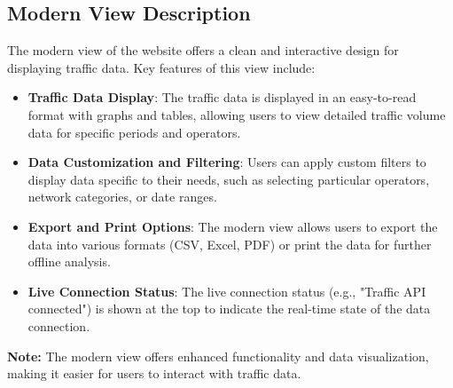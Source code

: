 \subsection{Modern View Description}
The modern view of the website offers a clean and interactive design for displaying traffic data. Key features of this view include:
\begin{itemize}
  \item \textbf{Traffic Data Display}: The traffic data is displayed in an easy-to-read format with graphs and tables, allowing users to view detailed traffic volume data for specific periods and operators.
  \item \textbf{Data Customization and Filtering}: Users can apply custom filters to display data specific to their needs, such as selecting particular operators, network categories, or date ranges.
  \item \textbf{Export and Print Options}: The modern view allows users to export the data into various formats (CSV, Excel, PDF) or print the data for further offline analysis.
  \item \textbf{Live Connection Status}: The live connection status (e.g., "Traffic API connected") is shown at the top to indicate the real-time state of the data connection.
\end{itemize}
\textbf{Note:} The modern view offers enhanced functionality and data visualization, making it easier for users to interact with traffic data.
